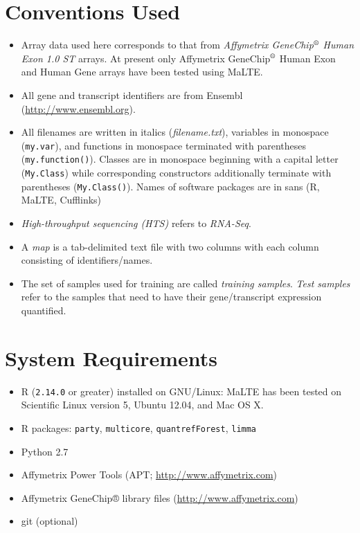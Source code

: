 \documentclass[a4paper,12pt]{article}
\begin{document}
\section{Conventions Used}
\label{conventions}
\begin{itemize}
\item Array data used here corresponds to that from \textit{Affymetrix GeneChip$^{\text{\textregistered}}$ Human Exon 1.0 ST} arrays. At present only Affymetrix GeneChip$^{\text{\textregistered}}$ Human Exon and Human Gene arrays have been tested using \textsf{MaLTE}.
\item All gene and transcript identifiers are from Ensembl (\url{http://www.ensembl.org}).
\item All filenames are written in italics (\textit{filename.txt}), variables in monospace (\texttt{my.var}), and functions in monospace terminated with parentheses (\texttt{my.function()}). Classes are in monospace beginning with a capital letter (\texttt{My.Class}) while corresponding constructors additionally terminate with parentheses (\texttt{My.Class()}). Names of software packages are in sans (\textsf{R}, \textsf{MaLTE}, \textsf{Cufflinks})
\item \textit{High-throughput sequencing (HTS)} refers to \textit{RNA-Seq}.
\item A \textit{map} is a tab-delimited text file with two columns with each column consisting of identifiers/names.
\item The set of samples used for training are called \textit{training samples}. \textit{Test samples} refer to the samples that need to have their gene/transcript expression quantified.
\end{itemize}

\section{System Requirements}
\label{system}
\begin{itemize}
\item \textsf{R} (\texttt{2.14.0} or greater) installed on GNU/Linux: \textsf{MaLTE} has been tested on Scientific Linux version 5, Ubuntu 12.04, and Mac OS X.
\item  \textsf{R} packages: \texttt{party}, \texttt{multicore}, \texttt{quantrefForest}, \texttt{limma}
\item \textsf{Python} 2.7
\item Affymetrix Power Tools (APT; \url{http://www.affymetrix.com})
\item Affymetrix GeneChip® library files (\url{http://www.affymetrix.com})
\item \textsf{git} (optional)

\end{itemize}
\end{document}
